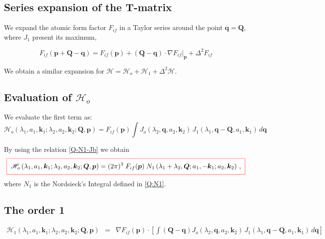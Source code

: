 \subsection{Series expansion of the T-matrix}

We expand the atomic form factor $F_{if}$ in a Taylor series around the
point $\bm{q}= \bm{Q}$, where $J_{1}$ present its maximum,

\begin{equation}\label{QTaylorFif}
F_{if}(\bm{p} + \bm{Q} - \bm{q}) = F_{if}(\bm{p}) + \left( \bm{Q} -
\bm{q} \right) \cdot \left. \nabla F_{if} \right| _{\bm{p}} +
\Delta^{2} F_{if}
\end{equation}

We obtain a similar expansion for $\mathcal{H} = \mathcal{H}_{o} +
\mathcal{H}_{1} + \Delta^{2} \mathcal{H}$.

\subsection*{Evaluation of $\mathcal{H}_{o}$}
We evaluate the first term as:
%
\begin{equation}\label{Q:mathc-lambd-a_1-1}
 \mathcal{H}_{o}\left( \lambda_{1},a_{1},\bm{k}_{1} ;
\lambda_{2},a_{2},\bm{k}_{2}; \bm{Q}, \bm{p} \right) = F_{if}(\bm{p})
\int J_{o}(\lambda_{2},\bm{q},a_{2},\bm{k}_{2}) \, J_{1}(\lambda_{1},
\bm{q}- \bm{Q} ,a_{1},\bm{k}_{1} ) \, d \bm{q}
\end{equation}

By using the relation \ref{Q-N1-Jb} we obtain
\begin{equation}\label{Q:fbeq-mathcalh_o}
  \fbeq{
\mathcal{H}_{o} \left( \lambda_{1},a_{1},\bm{k}_{1} ; \lambda_{2},
a_{2}, \bm{k}_{2} ; \bm{Q}, \bm{p} \right) = (2 \pi)^{3} \;
F_{if}(\bm{p}) \; N_{1} \left(\lambda_{1}+\lambda_{2}, \bm{Q} ; a_{1},
- \bm{k}_{1} ; a_{2}, \bm{k}_{2} \right) \, ,
  }
\end{equation}
%
where $N_{1}$ is the Nordsieck's Integral defined in \ref{Q:N1}.

\subsection*{The order 1}
%
\begin{eqnarray}\label{Q:order1}
 \mathcal{H}_{1}\left( \lambda_{1},a_{1},\bm{k}_{1} ;
\lambda_{2}, a_{2}, \bm{k}_{2}; \bm{Q}, \bm{p} \right) &=&  \nabla
F_{if} ({\bm{p}}) \cdot  \left[ \int \left( \bm{Q} - \bm{q} \right)
J_{o}(\lambda_{2},\bm{q},a_{2},\bm{k}_{2}) \,  J_{1}(\lambda_{1},
\bm{q}- \bm{Q} ,a_{1},\bm{k}_{1} ) \, d \bm{q} \right]
\end{eqnarray}

